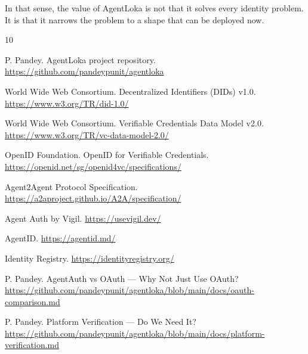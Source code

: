 \documentclass[11pt]{article}
\begin{document}
In that sense, the value of AgentLoka is not that it solves every identity problem. It is that it narrows the problem to a shape that can be deployed now.

\small
\begin{thebibliography}{10}

P. Pandey.
\newblock AgentLoka project repository.
\newblock \url{https://github.com/pandeypunit/agentloka}

World Wide Web Consortium.
\newblock Decentralized Identifiers (DIDs) v1.0.
\newblock \url{https://www.w3.org/TR/did-1.0/}

World Wide Web Consortium.
\newblock Verifiable Credentials Data Model v2.0.
\newblock \url{https://www.w3.org/TR/vc-data-model-2.0/}

OpenID Foundation.
\newblock OpenID for Verifiable Credentials.
\newblock \url{https://openid.net/sg/openid4vc/specifications/}

Agent2Agent Protocol Specification.
\newblock \url{https://a2aproject.github.io/A2A/specification/}

Agent Auth by Vigil.
\newblock \url{https://usevigil.dev/}

AgentID.
\newblock \url{https://agentid.md/}

Identity Registry.
\newblock \url{https://identityregistry.org/}

P. Pandey.
\newblock AgentAuth vs OAuth --- Why Not Just Use OAuth?
\newblock \url{https://github.com/pandeypunit/agentloka/blob/main/docs/oauth-comparison.md}

P. Pandey.
\newblock Platform Verification --- Do We Need It?
\newblock \url{https://github.com/pandeypunit/agentloka/blob/main/docs/platform-verification.md}

\end{thebibliography}
\end{document}
